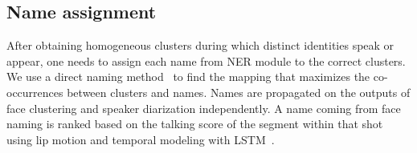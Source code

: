 \subsection{Name assignment}

After obtaining homogeneous clusters during which distinct identities speak or appear, one needs to assign each name from NER module to the correct clusters. 
%
%
We use a direct naming method~\cite{poignant2012fusion} to find the mapping that maximizes the co-occurrences between clusters and names.
%
Names are propagated on the outputs of face clustering and speaker diarization independently. 
%
%
A name coming from face naming is ranked based on the talking score of the segment within that shot using lip motion and temporal modeling with LSTM~\cite{Le_ACMMM_2016}.

\endinput
